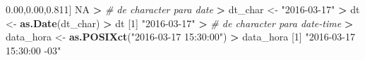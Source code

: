 \documentclass[]{book}
\newenvironment{Shaded}{\begin{snugshade}}{\end{snugshade}}
\newcommand{\KeywordTok}[1]{\textcolor[rgb]{0.13,0.29,0.53}{\textbf{#1}}}
\newcommand{\DecValTok}[1]{\textcolor[rgb]{0.00,0.00,0.81}{#1}}
\newcommand{\StringTok}[1]{\textcolor[rgb]{0.31,0.60,0.02}{#1}}
\newcommand{\CommentTok}[1]{\textcolor[rgb]{0.56,0.35,0.01}{\textit{#1}}}
\newcommand{\OtherTok}[1]{\textcolor[rgb]{0.56,0.35,0.01}{#1}}
\newcommand{\OperatorTok}[1]{\textcolor[rgb]{0.81,0.36,0.00}{\textbf{#1}}}
\newcommand{\ErrorTok}[1]{\textcolor[rgb]{0.64,0.00,0.00}{\textbf{#1}}}
\newcommand{\NormalTok}[1]{#1}
\begin{document}
\begin{Shaded}
\begin{Highlighting}[]
\NormalTok{[}\DecValTok{1}\NormalTok{] }\OtherTok{NA}
\OperatorTok{>}\StringTok{ }\CommentTok{# de character para date}
\ErrorTok{>}\StringTok{ }\NormalTok{dt_char <-}\StringTok{ "2016-03-17"}
\OperatorTok{>}\StringTok{ }\NormalTok{dt <-}\StringTok{ }\KeywordTok{as.Date}\NormalTok{(dt_char)}
\OperatorTok{>}\StringTok{ }\NormalTok{dt}
\NormalTok{[}\DecValTok{1}\NormalTok{] }\StringTok{"2016-03-17"}
\OperatorTok{>}\StringTok{ }\CommentTok{# de character para date-time}
\ErrorTok{>}\StringTok{ }\NormalTok{data_hora <-}\StringTok{ }\KeywordTok{as.POSIXct}\NormalTok{(}\StringTok{"2016-03-17 15:30:00"}\NormalTok{)}
\OperatorTok{>}\StringTok{ }\NormalTok{data_hora}
\NormalTok{[}\DecValTok{1}\NormalTok{] }\StringTok{"2016-03-17 15:30:00 -03"}
\end{Highlighting}
\end{Shaded}


\end{document}
